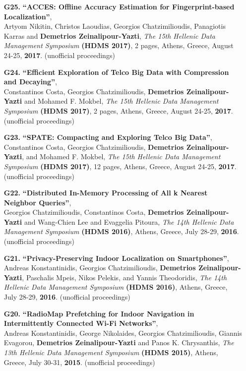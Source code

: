 \documentclass[10pt]{article}
\begin{document}
\begin{enumerate}
\item[{\bf G25.}]
\label{G25}
{\bf ``ACCES: Offline Accuracy Estimation for Fingerprint-based Localization''}, \\
Artyom Nikitin, Christos Laoudias,  Georgios Chatzimilioudis, Panagiotis Karras and {\bf Demetrios Zeinalipour-Yazti},
{\em The 15th Hellenic Data Management Symposium} {\bf (HDMS 2017)}, 2 pages,
Athens, Greece, August 24-25, {\bf 2017}. (unofficial proceedings)

\item[{\bf G24.}]
\label{G24}
{\bf ``Efficient Exploration of Telco Big Data with Compression and Decaying''}, \\
Constantinos Costa, Georgios Chatzimilioudis, {\bf Demetrios Zeinalipour-Yazti} and Mohamed F. Mokbel,
{\em The 15th Hellenic Data Management Symposium} {\bf (HDMS 2017)}, 2 pages,
Athens, Greece, August 24-25, {\bf 2017}. (unofficial proceedings)

\item[{\bf G23.}]
\label{G23}
{\bf ``SPATE: Compacting and Exploring Telco Big Data''}, \\
Constantinos Costa, Georgios Chatzimilioudis, {\bf Demetrios Zeinalipour-Yazti}, and Mohamed F. Mokbel,
{\em The 15th Hellenic Data Management Symposium} {\bf (HDMS 2017)}, 12 pages,
Athens, Greece, August 24-25, {\bf 2017}. (unofficial proceedings)

\item[{\bf G22.}]
\label{G22}
{\bf ``Distributed In-Memory Processing of All k Nearest Neighbor Queries''}, \\
Georgios Chatzimilioudis, Constantinos Costa, {\bf Demetrios Zeinalipour-Yazti} and
Wang-Chien Lee and Evaggelia Pitoura,
{\em The 14th Hellenic Data Management Symposium} {\bf (HDMS 2016)},
Athens, Greece, July 28-29, {\bf 2016}. (unofficial proceedings)

\item[{\bf G21.}]
\label{G21}
{\bf ``Privacy-Preserving Indoor Localization on Smartphones''}, \\
Andreas Konstantinidis, Georgios Chatzimilioudis, {\bf Demetrios Zeinalipour-Yazti}, Paschalis Mpeis, Nikos Pelekis, and Yannis Theodoridis,
{\em The 14th Hellenic Data Management Symposium} {\bf (HDMS 2016)},
Athens, Greece, July 28-29, {\bf 2016}. (unofficial proceedings)

\item[{\bf G20.}]
\label{G20}
{\bf ``RadioMap Prefetching for Indoor Navigation in Intermittently Connected Wi-Fi Networks''}, \\
Andreas Konstantinidis, George Nikolaides, Georgios Chatzimilioudis, Giannis Evagorou,  {\bf Demetrios Zeinalipour-Yazti} and Panos K. Chrysanthis,
{\em The 13th Hellenic Data Management Symposium} {\bf (HDMS 2015)},
Athens, Greece, July 30-31, {\bf 2015}. (unofficial proceedings)


\end{enumerate}
\end{document}
